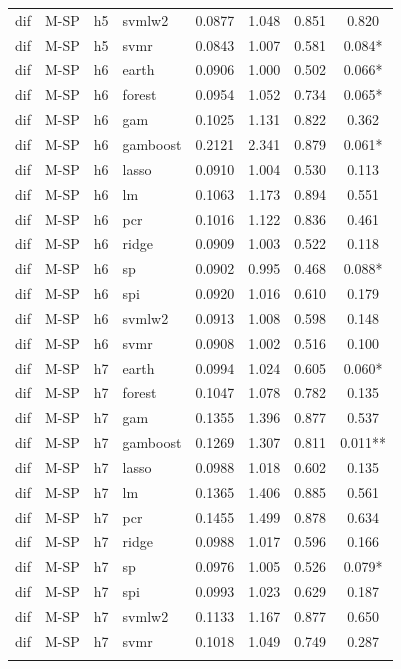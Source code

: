\begin{ThreePartTable}
\begin{longtable}[t]{llclcccc}
dif & M-SP & h5 & svmlw2 & 0.0877 & 1.048 & 0.851 & 0.820\\
dif & M-SP & h5 & svmr & 0.0843 & 1.007 & 0.581 & 0.084*\\
\addlinespace
dif & M-SP & h6 & earth & 0.0906 & 1.000 & 0.502 & 0.066*\\
dif & M-SP & h6 & forest & 0.0954 & 1.052 & 0.734 & 0.065*\\
dif & M-SP & h6 & gam & 0.1025 & 1.131 & 0.822 & 0.362\\
dif & M-SP & h6 & gamboost & 0.2121 & 2.341 & 0.879 & 0.061*\\
dif & M-SP & h6 & lasso & 0.0910 & 1.004 & 0.530 & 0.113\\
dif & M-SP & h6 & lm & 0.1063 & 1.173 & 0.894 & 0.551\\
dif & M-SP & h6 & pcr & 0.1016 & 1.122 & 0.836 & 0.461\\
dif & M-SP & h6 & ridge & 0.0909 & 1.003 & 0.522 & 0.118\\
dif & M-SP & h6 & sp & 0.0902 & 0.995 & 0.468 & 0.088*\\
dif & M-SP & h6 & spi & 0.0920 & 1.016 & 0.610 & 0.179\\
dif & M-SP & h6 & svmlw2 & 0.0913 & 1.008 & 0.598 & 0.148\\
dif & M-SP & h6 & svmr & 0.0908 & 1.002 & 0.516 & 0.100\\
\addlinespace
dif & M-SP & h7 & earth & 0.0994 & 1.024 & 0.605 & 0.060*\\
dif & M-SP & h7 & forest & 0.1047 & 1.078 & 0.782 & 0.135\\
dif & M-SP & h7 & gam & 0.1355 & 1.396 & 0.877 & 0.537\\
dif & M-SP & h7 & gamboost & 0.1269 & 1.307 & 0.811 & 0.011**\\
dif & M-SP & h7 & lasso & 0.0988 & 1.018 & 0.602 & 0.135\\
dif & M-SP & h7 & lm & 0.1365 & 1.406 & 0.885 & 0.561\\
dif & M-SP & h7 & pcr & 0.1455 & 1.499 & 0.878 & 0.634\\
dif & M-SP & h7 & ridge & 0.0988 & 1.017 & 0.596 & 0.166\\
dif & M-SP & h7 & sp & 0.0976 & 1.005 & 0.526 & 0.079*\\
dif & M-SP & h7 & spi & 0.0993 & 1.023 & 0.629 & 0.187\\
dif & M-SP & h7 & svmlw2 & 0.1133 & 1.167 & 0.877 & 0.650\\
dif & M-SP & h7 & svmr & 0.1018 & 1.049 & 0.749 & 0.287\\
\addlinespace

\end{longtable}
\end{ThreePartTable}
